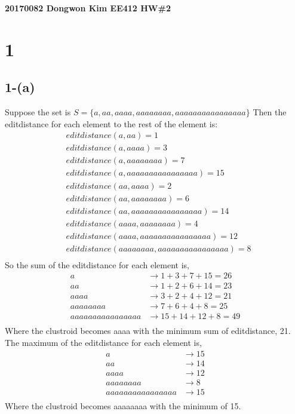 \documentclass{article}
\begin{document}
\noindent
\textbf{20170082 Dongwon Kim EE412 HW\#2}\\

\section*{1}
\subsection*{1-(a)}
Suppose the set is $S = \{a, aa, aaaa, aaaaaaaa, aaaaaaaaaaaaaaaa\}$
Then the editdistance for each element to the rest of the element is:
\begin{align*}
    &editdistance(a, aa) = 1 \\
    &editdistance(a, aaaa) = 3 \\
    &editdistance(a, aaaaaaaa) = 7 \\
    &editdistance(a, aaaaaaaaaaaaaaaa) = 15 \\
    &editdistance(aa, aaaa) = 2 \\
    &editdistance(aa, aaaaaaaa) = 6 \\
    &editdistance(aa, aaaaaaaaaaaaaaaa) = 14 \\
    &editdistance(aaaa, aaaaaaaa) = 4 \\
    &editdistance(aaaa, aaaaaaaaaaaaaaaa) = 12 \\
    &editdistance(aaaaaaaa, aaaaaaaaaaaaaaaa) = 8 \\
\end{align*}
So the sum of the editdistance for each element is,
\begin{align*}
    a &\rightarrow 1 + 3 + 7 + 15 = 26 \\
    aa &\rightarrow 1 + 2 + 6 + 14 = 23 \\
    aaaa &\rightarrow 3 + 2 + 4 + 12 = 21 \\
    aaaaaaaa &\rightarrow 7 + 6 + 4 + 8 = 25 \\
    aaaaaaaaaaaaaaaa &\rightarrow 15 + 14 + 12 + 8 = 49 \\
\end{align*}
Where the clustroid becomes aaaa with the minimum sum of editdistance, 21.
The maximum of the editdistance for each element is,
\begin{align*}
    a &\rightarrow 15 \\
    aa &\rightarrow 14 \\
    aaaa &\rightarrow 12 \\
    aaaaaaaa &\rightarrow 8 \\
    aaaaaaaaaaaaaaaa &\rightarrow 15 \\
\end{align*}
Where the clustroid becomes aaaaaaaa with the minimum of 15.
\end{document}
